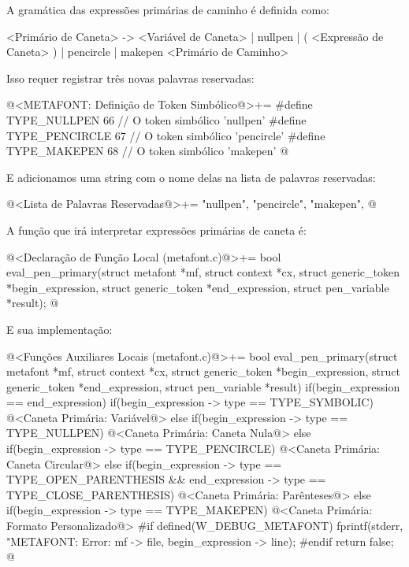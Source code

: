 {

A gramática das expressões primárias de caminho é definida como:

\alinhaverbatim
<Primário de Caneta> -> <Variável de Caneta> |
                        nullpen | ( <Expressão de Caneta> ) |
                        pencircle | makepen <Primário de Caminho>
\alinhanormal


Isso requer registrar três novas palavras reservadas:

\iniciocodigo
@<METAFONT: Definição de Token Simbólico@>+=
#define TYPE_NULLPEN        66 // O token simbólico 'nullpen'
#define TYPE_PENCIRCLE      67 // O token simbólico 'pencircle'
#define TYPE_MAKEPEN        68 // O token simbólico 'makepen'
@
\fimcodigo

E adicionamos uma string com o nome delas na lista de palavras
reservadas:

\iniciocodigo
@<Lista de Palavras Reservadas@>+=
"nullpen", "pencircle", "makepen",
@
\fimcodigo

A função que irá interpretar expressões primárias de caneta é:

\iniciocodigo
@<Declaração de Função Local (metafont.c)@>+=
bool eval_pen_primary(struct metafont *mf, struct context *cx,
                      struct generic_token *begin_expression,
                      struct generic_token *end_expression,
                      struct pen_variable *result);
@
\fimcodigo

E sua implementação:

\iniciocodigo
@<Funções Auxiliares Locais (metafont.c)@>+=
bool eval_pen_primary(struct metafont *mf, struct context *cx,
                      struct generic_token *begin_expression,
                      struct generic_token *end_expression,
                      struct pen_variable *result){
  if(begin_expression == end_expression){
    if(begin_expression -> type == TYPE_SYMBOLIC){
      @<Caneta Primária: Variável@>
    }
    else if(begin_expression -> type == TYPE_NULLPEN){
      @<Caneta Primária: Caneta Nula@>
    }
    else if(begin_expression -> type == TYPE_PENCIRCLE){
      @<Caneta Primária: Caneta Circular@>
    }
  }
  else{
    if(begin_expression -> type == TYPE_OPEN_PARENTHESIS &&
      end_expression -> type == TYPE_CLOSE_PARENTHESIS){
      @<Caneta Primária: Parênteses@>
    }
    else if(begin_expression -> type == TYPE_MAKEPEN){
      @<Caneta Primária: Formato Personalizado@>
    }
  }
#if defined(W_DEBUG_METAFONT)
  fprintf(stderr, "METAFONT: Error: %
          mf -> file, begin_expression -> line);
#endif
  return false;
}
@
\fimcodigo

}
